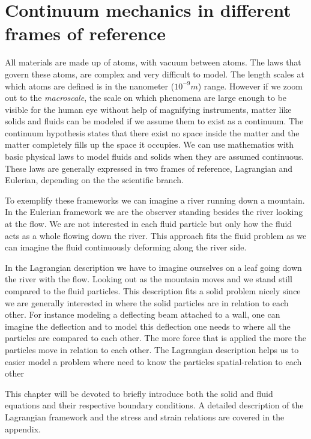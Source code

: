 \chapter{Continuum mechanics in different frames of reference}
All materials are made up of atoms, with vacuum between atoms. The laws that govern these atoms, are complex and very difficult to model. The length scales at which atoms are defined is in the nanometer ($10^{-9}m$) range. 
However if we zoom out to the \textit{macroscale}, the scale on which phenomena are large enough to be visible for the human eye without help of magnifying instruments, matter like solids and fluids can be modeled if we assume them to exist as a continuum. The continuum hypothesis states that there exist no space inside the matter and the matter completely fills up the space it occupies. 
We can use mathematics with basic physical laws to model fluids and solids when they are assumed continuous. These laws are generally expressed in two frames of reference, Lagrangian and Eulerian, depending on the the scientific branch. \newline

To exemplify these frameworks we can imagine a river running down a mountain.	
In the Eulerian framework we are the observer standing besides the river looking at the flow. We are not interested in each fluid particle but only how the fluid acts as a whole flowing down the river. This approach fits the fluid problem as we can imagine the fluid continuously deforming along the river side. \newline

In the Lagrangian description we have to imagine ourselves on a leaf going down the river with the flow. Looking out as the mountain moves and we stand still compared to the fluid particles. This description fits a solid problem nicely since we are generally interested in where the solid particles are in relation to each other. For instance modeling a deflecting beam attached to a wall, one can imagine the deflection and to model this deflection one needs to where all the particles are compared to each other. The more force that is applied the more the particles move in relation to each other. The Lagrangian description helps us to easier model a problem where need to know the particles spatial-relation to each other \newline

This chapter will be devoted to briefly introduce both the solid and fluid equations and their respective boundary conditions. A detailed description of the Lagrangian framework and the stress and strain relations are covered in the appendix.

